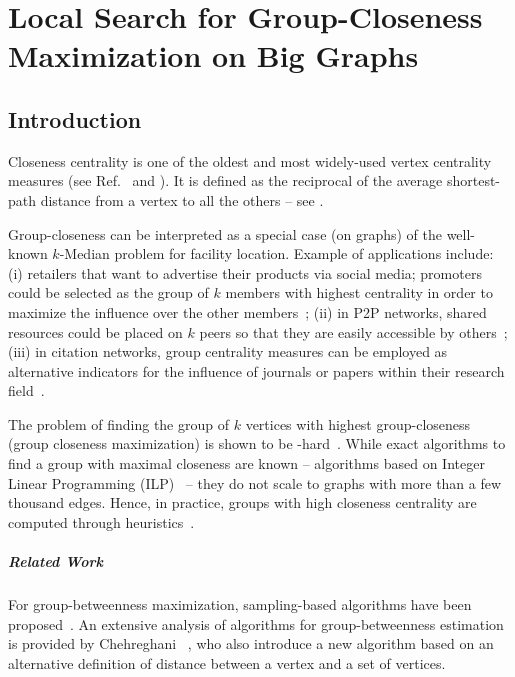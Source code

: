 \chapter{Local Search for Group-Closeness Maximization on Big Graphs}
\label{ch:group-closeness-local-search}



\section{Introduction}
\label{sec:lsh-gc-intro}
Closeness centrality is one of the oldest and most widely-used vertex
centrality measures (see Ref.~\cite{bavelas1948mathematical} and
). It is defined as the
reciprocal of the average shortest-path distance from
a vertex to all the others -- see .

Group-closeness can be interpreted as a special case (on graphs)
of the well-known $k$-Median problem for facility location.
Example of applications include: (i) retailers that want to advertise
their products via social media; promoters could be selected as the
group of $k$ members with highest centrality in order to maximize the
influence over the other members~\cite{DBLP:journals/isci/ZhuWWZ14};
(ii) in P2P networks, shared resources could be placed on $k$ peers so
that they are easily accessible by others~\cite{DBLP:journals/pe/GkantsidisMS06};
(iii) in citation networks, group centrality measures can be employed as
alternative indicators for the influence of journals or papers within
their research field~\cite{DBLP:journals/jasis/Leydesdorff07a}.

The problem of finding the group of $k$ vertices with highest group-closeness
(group closeness maximization) is shown to be
\np-hard~\cite{DBLP:conf/adc/ChenWW16}. While exact algorithms to find a group
with maximal closeness are known -- \eg algorithms based on Integer Linear
Programming (ILP)~\cite{DBLP:conf/alenex/BergaminiGM18} -- they do not scale to
graphs with more than a few thousand edges. Hence, in practice, groups with
high closeness centrality are computed through
heuristics~\cite{DBLP:conf/adc/ChenWW16,DBLP:conf/alenex/BergaminiGM18}.

\paragraph{Related Work}
%
For group-betweenness maximization, sampling-based algorithms have been
proposed~\cite{DBLP:conf/kdd/MahmoodyTU16,DBLP:conf/kdd/Yoshida14}. An
extensive analysis of algorithms for group-betweenness estimation is provided
by Chehreghani \etal~\cite{DBLP:conf/bigdataconf/ChehreghaniBA18}, who also
introduce a new algorithm based on an alternative definition of distance
between a vertex and a set of vertices.

